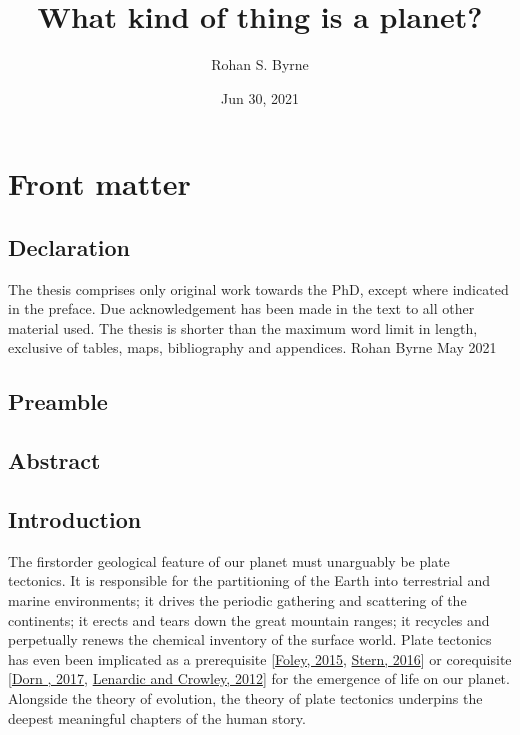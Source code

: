 \documentclass[letterpaper,10pt,english]{jupyterBook}
\title{What kind of thing is a planet?}
\date{Jun 30, 2021}
\author{Rohan S.\@{} Byrne}
\begin{document}
\pagestyle{empty}
\sphinxmaketitle
\pagestyle{plain}
\sphinxtableofcontents
\pagestyle{normal}
\label{\detokenize{index::doc}}


\sphinxAtStartPar
{}


\part{Front matter}


\chapter{Declaration}
\label{\detokenize{frontmatter/declaration:declaration}}\label{\detokenize{frontmatter/declaration::doc}}
\sphinxAtStartPar
The thesis comprises only original work towards the PhD, except where indicated in the preface. Due acknowledgement has been made in the text to all other material used. The thesis is shorter than the maximum word limit in length, exclusive of tables, maps, bibliography and appendices.
Rohan Byrne
May 2021


\chapter{Preamble}
\label{\detokenize{frontmatter/preamble:preamble}}\label{\detokenize{frontmatter/preamble::doc}}

\chapter{Abstract}
\label{\detokenize{frontmatter/abstract:abstract}}\label{\detokenize{frontmatter/abstract::doc}}

\chapter{Introduction}
\label{\detokenize{frontmatter/introduction:introduction}}\label{\detokenize{frontmatter/introduction::doc}}
\sphinxAtStartPar
The first\sphinxhyphen{}order geological feature of our planet must unarguably be plate tectonics. It is responsible for the partitioning of the Earth into terrestrial and marine environments; it drives the periodic gathering and scattering of the continents; it erects and tears down the great mountain ranges; it recycles and perpetually renews the chemical inventory of the surface world. Plate tectonics has even been implicated as a prerequisite {[}\hyperlink{cite.references:id354}{Foley, 2015}, \hyperlink{cite.references:id353}{Stern, 2016}{]} or co\sphinxhyphen{}requisite {[}\hyperlink{cite.references:id741}{Dorn , 2017}, \hyperlink{cite.references:id332}{Lenardic and Crowley, 2012}{]} for the emergence of life on our planet. Alongside the theory of evolution, the theory of plate tectonics underpins the deepest meaningful chapters of the human story.
\end{document}
